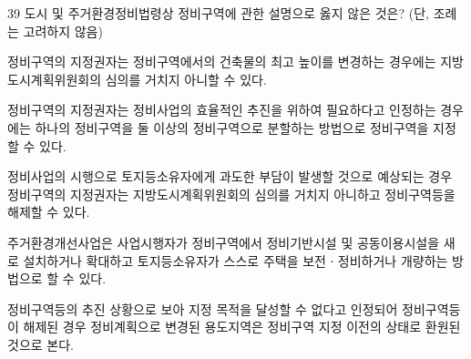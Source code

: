 \begin{question}{39}
도시 및 주거환경정비법령상 정비구역에 관한 설명으로 옳지 않은 것은? (단, 조례는 고려하지 않음)
\begin{choices}
  \item 정비구역의 지정권자는 정비구역에서의 건축물의 최고 높이를 변경하는 경우에는 지방도시계획위원회의 심의를 거치지 아니할 수 있다.
  \item 정비구역의 지정권자는 정비사업의 효율적인 추진을 위하여 필요하다고 인정하는 경우에는 하나의 정비구역을 둘 이상의 정비구역으로 분할하는 방법으로 정비구역을 지정할 수 있다.
  \item 정비사업의 시행으로 토지등소유자에게 과도한 부담이 발생할 것으로 예상되는 경우 정비구역의 지정권자는 지방도시계획위원회의 심의를 거치지 아니하고 정비구역등을 해제할 수 있다.
  \item 주거환경개선사업은 사업시행자가 정비구역에서 정비기반시설 및 공동이용시설을 새로 설치하거나 확대하고 토지등소유자가 스스로 주택을 보전ㆍ정비하거나 개량하는 방법으로 할 수 있다.
  \item 정비구역등의 추진 상황으로 보아 지정 목적을 달성할 수 없다고 인정되어 정비구역등이 해제된 경우 정비계획으로 변경된 용도지역은 정비구역 지정 이전의 상태로 환원된 것으로 본다.
\end{choices}
\end{question}
